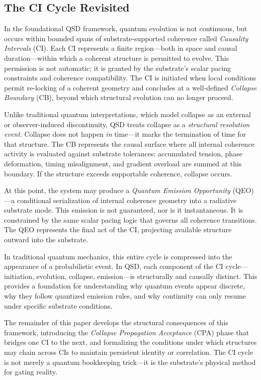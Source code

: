 \documentclass[preprints,article,submit,pdftex,moreauthors]{Definitions/mdpi}
\begin{document}
\subsection{The CI Cycle Revisited}

In the foundational QSD framework, quantum evolution is not continuous, but occurs within bounded spans of substrate-supported coherence called \emph{Causality Intervals} (CI). Each CI represents a finite region—both in space and causal duration—within which a coherent structure is permitted to evolve. This permission is not automatic; it is granted by the substrate’s scalar pacing constraints and coherence compatibility. The CI is initiated when local conditions permit re-locking of a coherent geometry and concludes at a well-defined \emph{Collapse Boundary} (CB), beyond which structural evolution can no longer proceed.

Unlike traditional quantum interpretations, which model collapse as an external or observer-induced discontinuity, QSD treats collapse as a \emph{structural resolution event}. Collapse does not happen \emph{in} time—it marks the termination of time for that structure. The CB represents the causal surface where all internal coherence activity is evaluated against substrate tolerances: accumulated tension, phase deformation, timing misalignment, and gradient overload are summed at this boundary. If the structure exceeds supportable coherence, collapse occurs.

At this point, the system may produce a \emph{Quantum Emission Opportunity} (QEO)—a conditional serialization of internal coherence geometry into a radiative substrate mode. This emission is not guaranteed, nor is it instantaneous. It is constrained by the same scalar pacing logic that governs all coherence transitions. The QEO represents the final act of the CI, projecting available structure outward into the substrate.

In traditional quantum mechanics, this entire cycle is compressed into the appearance of a probabilistic event. In QSD, each component of the CI cycle—initiation, evolution, collapse, emission—is structurally and causally distinct. This provides a foundation for understanding why quantum events appear discrete, why they follow quantized emission rules, and why continuity can only resume under specific substrate conditions.

The remainder of this paper develops the structural consequences of this framework, introducing the \emph{Collapse Propagation Acceptance} (CPA) phase that bridges one CI to the next, and formalizing the conditions under which structures may chain across CIs to maintain persistent identity or correlation. The CI cycle is not merely a quantum bookkeeping trick—it is the substrate’s physical method for gating reality.
\end{document}
